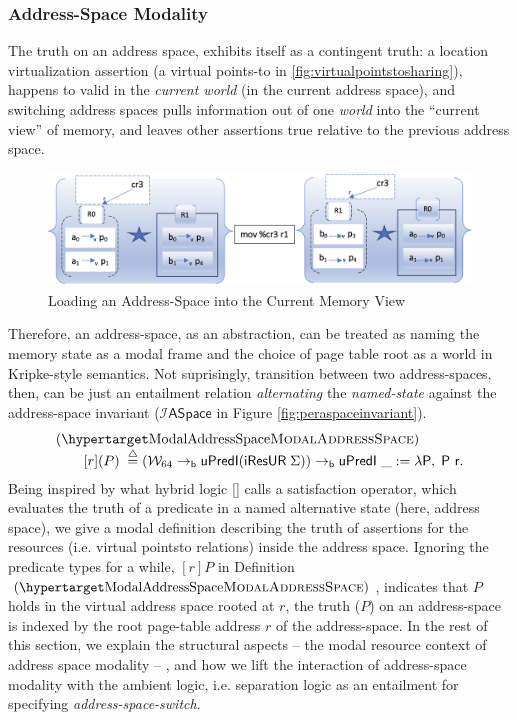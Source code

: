 \subsubsection{Address-Space Modality}
\label{sec:aspacemodalist}
The truth on an address space, exhibits itself as a contingent truth: a location virtualization assertion (a virtual points-to in \ref{fig:virtualpointstosharing}),  happens to valid in the \textit{current world} (in the current address space), and switching address spaces pulls information out of one \textit{world} into the “current view” of memory, and leaves other assertions true relative to the previous address space.
\begin{figure}
   \includegraphics[width=\columnwidth]{addr_space_switch.png}
  \caption{Loading an Address-Space into the Current Memory View}
  \label{fig:addrswitch}
  \end{figure}
Therefore, an address-space, as an abstraction, can be treated as naming the memory state as a modal frame and the choice of page table root as a world in Kripke-style semantics. Not suprisingly, transition between two address-spaces, then, can be just an entailment relation \textit{alternating} the \textit{named-state} against the address-space invariant ($\mathcal{I}\textsf{ASpace}$ in Figure \ref{fig:peraspaceinvariant}). 
\[
  \begin{array}{l}
    \hbox{(\TirNameStyle{ModalAddressSpace})} \\ \qquad
         [r](P)  \;\stackrel{\triangle}{=}  (\mathcal{W}_{64} \rightarrow_{\textsf{b}} \textsf{uPredI} (\textsf{iResUR} \;\Sigma)) \rightarrow_{\textsf{b}} \textsf{uPredI } \_ := \lambda \textsf{P},\; \textsf{P r}. 
  \end{array}
\]
Being inspired by what hybrid logic \ref{} calls a satisfaction operator, which evaluates the truth of a predicate in a named alternative state (here, address space), we give a modal definition describing the truth of assertions for the resources (i.e. virtual pointsto relations) inside the address space. Ignoring the predicate types for a while, $[r]P$ in Definition $\hbox{(\TirNameStyle{ModalAddressSpace})}$, indicates that $P$ holds in the virtual address space rooted at $r$, the truth ($P$) on an address-space is indexed by the root page-table address $r$ of the address-space. In the rest of this section, we explain the structural aspects -- the modal resource context of address space modality -- , and how we lift the interaction of address-space modality with the ambient logic, i.e. separation logic as an entailment for specifying \textit{address-space-switch}.  
